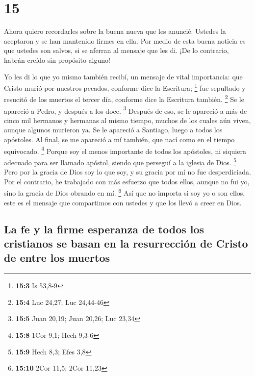 \hypertarget{section-14}{%
\section{15}\label{section-14}}

 Ahora quiero recordarles sobre la buena nueva que les
anuncié. Ustedes la aceptaron y se han mantenido firmes en ella.
 Por medio de esta buena noticia es que ustedes son
salvos, si se aferran al mensaje que les di. ¡De lo contrario, habrán
creído sin propósito alguno!

 Yo les di lo que yo mismo también recibí, un mensaje de
vital importancia: que Cristo murió por nuestros pecados, conforme dice
la Escritura; \footnote{\textbf{15:3} Is 53,8-9}  fue
sepultado y resucitó de los muertos el tercer día, conforme dice la
Escritura también. \footnote{\textbf{15:4} Luc 24,27; Luc 24,44-46}
 Se le apareció a Pedro, y después a los doce. \footnote{\textbf{15:5}
  Juan 20,19; Juan 20,26; Luc 23,34}  Después de eso, se
le apareció a más de cinco mil hermanos y hermanas al mismo tiempo,
muchos de los cuales aún viven, aunque algunos murieron ya.
 Se le apareció a Santiago, luego a todos los apóstoles.
 Al final, se me apareció a mí también, que nací como en
el tiempo equivocado. \footnote{\textbf{15:8} 1Cor 9,1; Hech 9,3-6}
 Porque soy el menos importante de todos los apóstoles, ni
siquiera adecuado para ser llamado apóstol, siendo que perseguí a la
iglesia de Dios. \footnote{\textbf{15:9} Hech 8,3; Efes 3,8}
 Pero por la gracia de Dios soy lo que soy, y su gracia
por mí no fue desperdiciada. Por el contrario, he trabajado con más
esfuerzo que todos ellos, aunque no fui yo, sino la gracia de Dios
obrando en mí. \footnote{\textbf{15:10} 2Cor 11,5; 2Cor 11,23}
 Así que no importa si soy yo o son ellos, este es el
mensaje que compartimos con ustedes y que los llevó a creer en Dios.

\hypertarget{la-fe-y-la-firme-esperanza-de-todos-los-cristianos-se-basan-en-la-resurrecciuxf3n-de-cristo-de-entre-los-muertos}{%
\subsection{La fe y la firme esperanza de todos los cristianos se basan
en la resurrección de Cristo de entre los
muertos}\label{la-fe-y-la-firme-esperanza-de-todos-los-cristianos-se-basan-en-la-resurrecciuxf3n-de-cristo-de-entre-los-muertos}}

